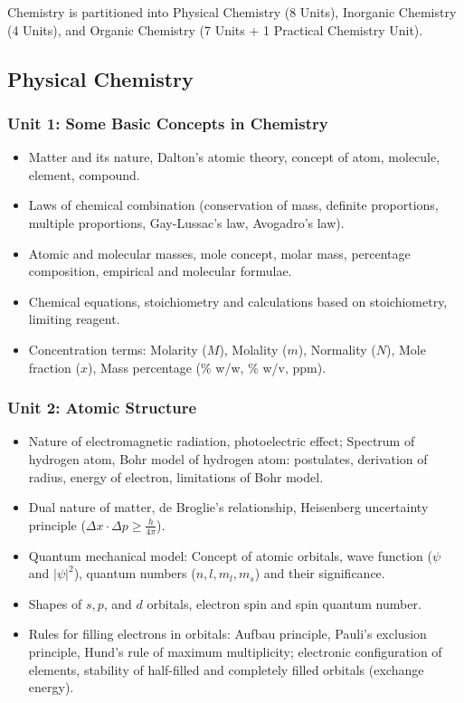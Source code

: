 \documentclass[11pt,a4paper]{article}
\begin{document}
Chemistry is partitioned into Physical Chemistry (8 Units), Inorganic Chemistry (4 Units), and Organic Chemistry (7 Units + 1 Practical Chemistry Unit).

\subsection{Physical Chemistry}

\subsubsection{Unit 1: Some Basic Concepts in Chemistry}
\begin{itemize}
  \item Matter and its nature, Dalton's atomic theory, concept of atom, molecule, element, compound.
  \item Laws of chemical combination (conservation of mass, definite proportions, multiple proportions, Gay-Lussac's law, Avogadro's law).
  \item Atomic and molecular masses, mole concept, molar mass, percentage composition, empirical and molecular formulae.
  \item Chemical equations, stoichiometry and calculations based on stoichiometry, limiting reagent.
  \item Concentration terms: Molarity ($M$), Molality ($m$), Normality ($N$), Mole fraction ($x$), Mass percentage (\% w/w, \% w/v, ppm).
\end{itemize}

\subsubsection{Unit 2: Atomic Structure}
\begin{itemize}
  \item Nature of electromagnetic radiation, photoelectric effect; Spectrum of hydrogen atom, Bohr model of hydrogen atom: postulates, derivation of radius, energy of electron, limitations of Bohr model.
  \item Dual nature of matter, de Broglie's relationship, Heisenberg uncertainty principle ($\Delta x \cdot \Delta p \ge \frac{h}{4\pi}$).
  \item Quantum mechanical model: Concept of atomic orbitals, wave function ($\psi$ and $|\psi|^2$), quantum numbers ($n, l, m_l, m_s$) and their significance.
  \item Shapes of $s, p$, and $d$ orbitals, electron spin and spin quantum number.
  \item Rules for filling electrons in orbitals: Aufbau principle, Pauli's exclusion principle, Hund's rule of maximum multiplicity; electronic configuration of elements, stability of half-filled and completely filled orbitals (exchange energy).
\end{itemize}
\end{document}
